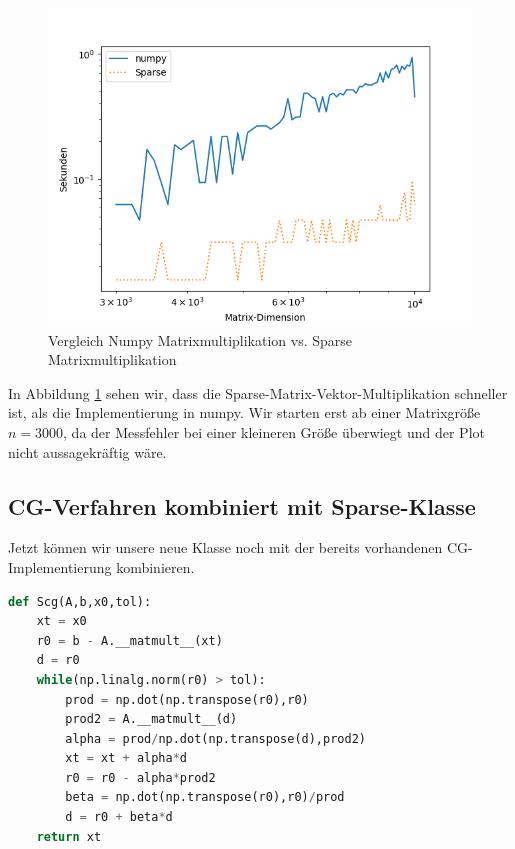 \begin{figure}
    \centering
    \includegraphics[width=0.8\linewidth]{Aufgabe_1/matmult_plot.png}
    \caption{Vergleich Numpy Matrixmultiplikation vs. Sparse Matrixmultiplikation}
    \label{mul}
\end{figure}
\FloatBarrier

In Abbildung \ref{mul} sehen wir, dass die Sparse-Matrix-Vektor-Multiplikation schneller ist, als die Implementierung in numpy.
Wir starten erst ab einer Matrixgröße $n=3000$, da der Messfehler bei einer kleineren Größe überwiegt und der Plot nicht aussagekräftig wäre.


\subsection{CG-Verfahren kombiniert mit Sparse-Klasse}
Jetzt können wir unsere neue Klasse noch mit der bereits vorhandenen CG-Implementierung kombinieren. \\
\begin{lstlisting}[language=Python]
def Scg(A,b,x0,tol):
    xt = x0
    r0 = b - A.__matmult__(xt)
    d = r0
    while(np.linalg.norm(r0) > tol):
        prod = np.dot(np.transpose(r0),r0)
        prod2 = A.__matmult__(d)
        alpha = prod/np.dot(np.transpose(d),prod2)
        xt = xt + alpha*d
        r0 = r0 - alpha*prod2
        beta = np.dot(np.transpose(r0),r0)/prod
        d = r0 + beta*d
    return xt
\end{lstlisting}

